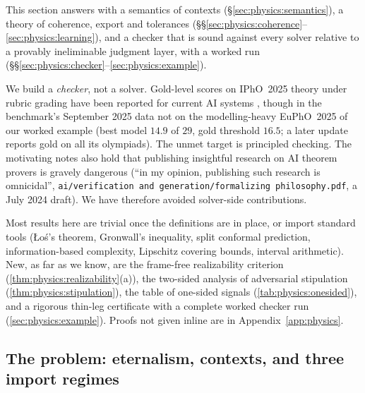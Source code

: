 This section answers with a semantics of contexts (\S\ref{sec:physics:semantics}), a
theory of coherence, export and tolerances
(\S\S\ref{sec:physics:coherence}--\ref{sec:physics:learning}), and a checker that is sound
against every solver relative to a provably ineliminable judgment layer, with a worked run
(\S\S\ref{sec:physics:checker}--\ref{sec:physics:example}).

We build a \emph{checker}, not a solver. Gold-level scores on IPhO~2025 theory under
rubric grading have been reported for current AI systems
\citep{yu2025hipho,qiu2025supernova}, though in the benchmark's September 2025 data not
on the modelling-heavy EuPhO~2025 of our worked example (best model $14.9$ of $29$, gold
threshold $16.5$; a later update reports gold on all its olympiads). The unmet target is
principled checking. The motivating notes also hold that publishing insightful research
on AI theorem provers is gravely dangerous (``in my opinion, publishing such research is
omnicidal'', \texttt{ai/verification and generation/formalizing philosophy.pdf}, a July
2024 draft). We have therefore avoided solver-side contributions.

Most results here are trivial once the definitions are in place, or import standard tools
(\L{}o\'s's theorem, Gronwall's inequality, split conformal prediction, information-based
complexity, Lipschitz covering bounds, interval arithmetic). New, as far as we know, are the frame-free
realizability criterion (\cref{thm:physics:realizability}(a)), the two-sided analysis of
adversarial stipulation (\cref{thm:physics:stipulation}), the table of one-sided signals
(\cref{tab:physics:onesided}), and a rigorous thin-leg certificate with a complete worked
checker run (\cref{sec:physics:example}). Proofs not given inline are in
Appendix~\ref{app:physics}.

\subsection{The problem: eternalism, contexts, and three import regimes}\label{sec:physics:problem}

